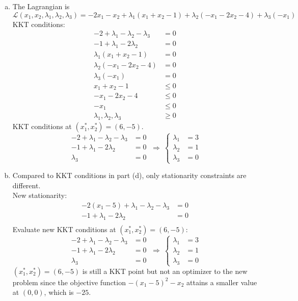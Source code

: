 \begin{enumerate}
\begin{enumerate}[(a)]
		\item The Lagrangian is
		$$
		\mathcal{L}(x_1,x_2,\lambda_1,\lambda_2,\lambda_3) = -2x_1-x_2 + \lambda_1 (x_1+x_2-1) + \lambda_2(-x_1-2x_2-4) + \lambda_3(-x_1)
		$$
		KKT conditions:
		\[
		\begin{aligned}
		-2 + \lambda_1-\lambda_2-\lambda_3 &= 0\\
		-1 + \lambda_1 -2\lambda_2 &=0\\
		 \lambda_1 (x_1+x_2-1) &=0\\
		 \lambda_2(-x_1-2x_2-4) &=0\\
		 \lambda_3(-x_1) &=0\\
		 x_1+x_2-1 &\le 0\\
		 -x_1-2x_2-4&\le 0\\
		 -x_1&\le 0\\
		 \lambda_1, \lambda_2,\lambda_3 &\ge 0
		\end{aligned}
		\]
		KKT conditions at $(x_1^*, x_2^*) = (6,-5)$.
		\[
		\begin{aligned}
		-2 + \lambda_1-\lambda_2-\lambda_3 &= 0\\
		-1 + \lambda_1 -2\lambda_2 &=0\\
		\lambda_3 &=0
		\end{aligned} ~\Rightarrow~ \left\{
		\begin{aligned}
		\lambda_1 &=3\\
		\lambda_2 &=1\\
		\lambda_3 &=0
		\end{aligned}
		\right.
		\]
		\item Compared to KKT conditions in part (d), only stationarity constraints are different.
		\\
		New stationarity:
		\[
		\begin{aligned}
		-2(x_1-5)+\lambda_1-\lambda_2-\lambda_3 &= 0\\
		-1 + \lambda_1 -2\lambda_2 &=0\\
		\end{aligned}
		\]
		Evaluate new KKT conditions at $(x_1^*,x_2^*) = (6,-5)$:
		\[
		\begin{aligned}
		-2 + \lambda_1-\lambda_2-\lambda_3 &= 0\\
		-1 + \lambda_1 -2\lambda_2 &=0\\
		\lambda_3 &=0
		\end{aligned} ~\Rightarrow~ \left\{
		\begin{aligned}
		\lambda_1 &=3\\
		\lambda_2 &=1\\
		\lambda_3 &=0
		\end{aligned}
		\right.
		\]
		$(x_1^*,x_2^*) = (6,-5)$ is still a KKT point but not an optimizer to the new problem since the objective function $-(x_1-5)^2-x_2$ attains a smaller value at $(0,0)$, which is $-25$. 
	\end{enumerate}


\end{enumerate}
